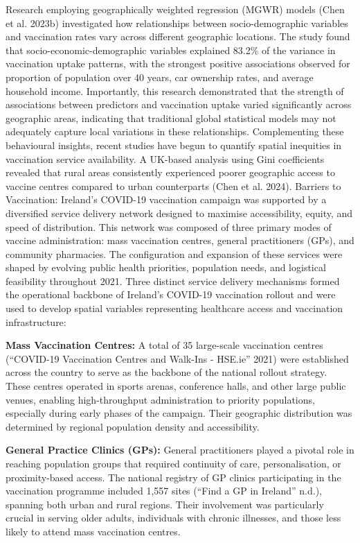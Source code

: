 \documentclass{article}
\begin{document}
Research employing geographically weighted regression (MGWR) models
(Chen et al. 2023b) investigated how relationships between
socio-demographic variables and vaccination rates vary across different
geographic locations. The study found that socio-economic-demographic
variables explained 83.2\% of the variance in vaccination uptake
patterns, with the strongest positive associations observed for
proportion of population over 40 years, car ownership rates, and average
household income. Importantly, this research demonstrated that the
strength of associations between predictors and vaccination uptake
varied significantly across geographic areas, indicating that
traditional global statistical models may not adequately capture local
variations in these relationships. Complementing these behavioural
insights, recent studies have begun to quantify spatial inequities in
vaccination service availability. A UK-based analysis using Gini
coefficients revealed that rural areas consistently experienced poorer
geographic access to vaccine centres compared to urban counterparts
(Chen et al. 2024). Barriers to Vaccination: Ireland's COVID-19
vaccination campaign was supported by a diversified service delivery
network designed to maximise accessibility, equity, and speed of
distribution. This network was composed of three primary modes of
vaccine administration: mass vaccination centres, general practitioners
(GPs), and community pharmacies. The configuration and expansion of
these services were shaped by evolving public health priorities,
population needs, and logistical feasibility throughout 2021. Three
distinct service delivery mechanisms formed the operational backbone of
Ireland's COVID-19 vaccination rollout and were used to develop spatial
variables representing healthcare access and vaccination infrastructure:

\textbf{Mass Vaccination Centres:} A total of 35 large-scale vaccination
centres ({``{COVID}-19 Vaccination Centres and Walk-Ins - {HSE}.ie''}
2021) were established across the country to serve as the backbone of
the national rollout strategy. These centres operated in sports arenas,
conference halls, and other large public venues, enabling
high-throughput administration to priority populations, especially
during early phases of the campaign. Their geographic distribution was
determined by regional population density and accessibility.

\textbf{General Practice Clinics (GPs):} General practitioners played a
pivotal role in reaching population groups that required continuity of
care, personalisation, or proximity-based access. The national registry
of GP clinics participating in the vaccination programme included 1,557
sites ({``Find a {GP} in {Ireland}''} n.d.), spanning both urban and
rural regions. Their involvement was particularly crucial in serving
older adults, individuals with chronic illnesses, and those less likely
to attend mass vaccination centres.
\end{document}
